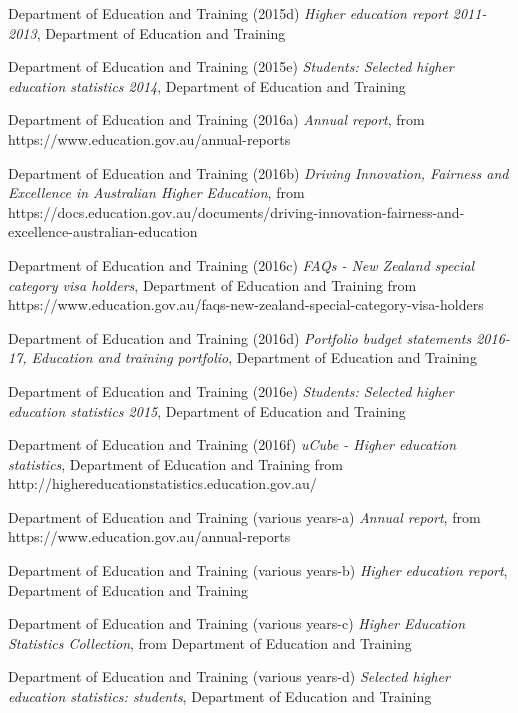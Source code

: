 \documentclass[]{book}
\begin{document}
\protect\hypertarget{_ENREF_27}{}{}Department of Education and Training (2015d) \emph{Higher education report 2011-2013}, Department of Education and Training

\protect\hypertarget{_ENREF_28}{}{}Department of Education and Training (2015e) \emph{Students: Selected higher education statistics 2014}, Department of Education and Training

\protect\hypertarget{_ENREF_29}{}{}Department of Education and Training (2016a) \emph{Annual report}, from https://www.education.gov.au/annual-reports

\protect\hypertarget{_ENREF_30}{}{}Department of Education and Training (2016b) \emph{Driving Innovation, Fairness and Excellence in Australian Higher Education}, from https://docs.education.gov.au/documents/driving-innovation-fairness-and-excellence-australian-education

\protect\hypertarget{_ENREF_31}{}{}Department of Education and Training (2016c) \emph{FAQs - New Zealand special category visa holders}, Department of Education and Training from https://www.education.gov.au/faqs-new-zealand-special-category-visa-holders

\protect\hypertarget{_ENREF_32}{}{}Department of Education and Training (2016d) \emph{Portfolio budget statements 2016-17, Education and training portfolio}, Department of Education and Training

\protect\hypertarget{_ENREF_33}{}{}Department of Education and Training (2016e) \emph{Students: Selected higher education statistics 2015}, Department of Education and Training

\protect\hypertarget{_ENREF_34}{}{}Department of Education and Training (2016f) \emph{uCube - Higher education statistics}, Department of Education and Training from http://highereducationstatistics.education.gov.au/

\protect\hypertarget{_ENREF_35}{}{}Department of Education and Training (various years-a) \emph{Annual report}, from https://www.education.gov.au/annual-reports

\protect\hypertarget{_ENREF_36}{}{}Department of Education and Training (various years-b) \emph{Higher education report}, Department of Education and Training

\protect\hypertarget{_ENREF_37}{}{}Department of Education and Training (various years-c) \emph{Higher Education Statistics Collection}, from Department of Education and Training

\protect\hypertarget{_ENREF_38}{}{}Department of Education and Training (various years-d) \emph{Selected higher education statistics: students}, Department of Education and Training
\end{document}
